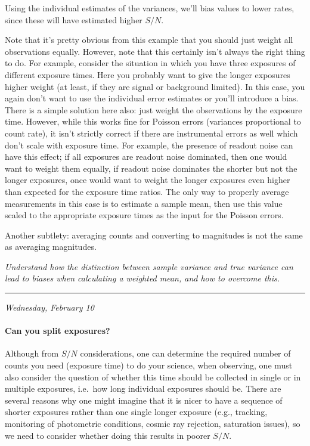 \documentclass[12pt]{article}
\newcommand{\test}[1]{%
    \begin{center}
        {\parbox{0.9\textwidth}{\textit{\small#1}}}
    \end{center}}
\newcommand{\mydate}[1]{
    \begin{flushright}
        \rule{\textwidth}{0.4pt} %
        \footnotesize\hfill\textit{#1}
    \end{flushright}}
\begin{document}
Using the individual estimates of the variances, we'll bias values to
lower rates, since these will have estimated higher $S/N$.

Note that it's pretty obvious from this example that you should just weight all
observations equally. However, note that this certainly isn't always the right
thing to do. For example, consider the situation in which you have three
exposures of different exposure times. Here you probably want to give the
longer exposures higher weight (at least, if they are signal or background
limited). In this case, you again don't want to use the individual error
estimates or you'll introduce a bias. There is a simple solution here also:
just weight the observations by the exposure time. However, while this works
fine for Poisson errors (variances proportional to count rate), it isn't
strictly correct if there are instrumental errors as well which don't scale
with exposure time. For example, the presence of readout noise can have this
effect; if all exposures are readout noise dominated, then one would want to
weight them equally, if readout noise dominates the shorter but not the longer
exposures, once would want to weight the longer exposures even higher than
expected for the exposure time ratios. The only way to properly average
measurements in this case is to estimate a sample mean, then use this value
scaled to the appropriate exposure times as the input for the Poisson errors.

Another subtlety: averaging counts and converting to magnitudes is
not the same as averaging magnitudes.

\test{Understand how the distinction between sample variance and true variance
can lead to biases when calculating a weighted mean, and how to overcome this.}

\mydate{Wednesday, February 10}

\paragraph{Can you split exposures?}

Although from $S/N$ considerations, one can determine the required
number of counts you need (exposure time) to do your science, when
observing, one must also consider the question of whether this time
should be collected in single or in multiple exposures, i.e.\ how long
individual exposures should be. There are several reasons why one
might imagine that it is nicer to have a sequence of shorter
exposures rather than one single longer exposure (e.g., tracking,
monitoring of photometric conditions, cosmic ray rejection,
saturation issues), so we need to consider whether doing this results
in poorer $S/N$.
\end{document}
